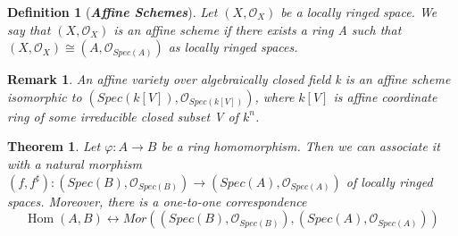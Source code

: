 \documentclass{ctexart}
\newtheorem{definition}{Definition}[section]
\newtheorem{remark}{Remark}[section]
\newtheorem{theorem}{Theorem}[section]
\renewcommand{\hom}{\operatorname{Hom}}
\begin{document}
\begin{definition}[\textbf{\emph{Affine Schemes}}]
    Let $(X, \mathcal{O}_{X})$ be a locally ringed space.
    We say that $(X, \mathcal{O}_{X})$ is an affine scheme if there exists a ring A such that $(X, \mathcal{O}_{X}) \cong (A, \mathcal{O}_{Spec(A)})$ as locally ringed spaces.
\end{definition}
\begin{remark}
    An affine variety over algebraically closed field k is an affine scheme isomorphic to $(Spec(k[V]), \mathcal{O}_{Spec(k[V])})$,
    where $k[V]$ is affine coordinate ring of some irreducible closed subset V of $k^{n}$.
\end{remark}
\begin{theorem}
    Let $\varphi: A \longrightarrow B$ be a ring homomorphism.
    Then we can associate it with a natural morphism $(f, f^{\sharp}): (Spec(B), \mathcal{O}_{Spec(B)}) \longrightarrow (Spec(A), \mathcal{O}_{Spec(A)})$ of locally ringed spaces.
    Moreover, there is a one-to-one correspondence 
    \begin{equation*}
        \hom(A, B) \longleftrightarrow Mor((Spec(B), \mathcal{O}_{Spec(B)}), (Spec(A), \mathcal{O}_{Spec(A)}))
    \end{equation*}
    \label{Theorem 1.2}
\end{theorem}
\end{document}
